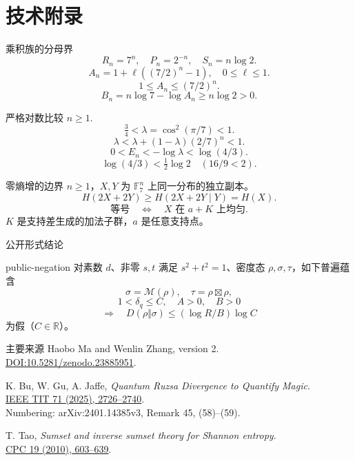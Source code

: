 \documentclass{beamer}
\begin{document}
\section{技术附录}
\begin{frame}{乘积族的分母界}
\[R_n=7^n,\quad P_n=2^{-n},\quad S_n=n\log2.\]
\[A_n=1+\ell((7/2)^n-1),\quad 0\le\ell\le1.\]
\[1\le A_n\le(7/2)^n.\]
\[B_n=n\log7-\log A_n\ge n\log2>0.\]
\end{frame}
\begin{frame}{严格对数比较}
$n\ge1$.
\[\tfrac34\mathrel{<}\lambda=\cos^2(\pi/7)\mathrel{<}1.\]
\[\lambda\mathrel{<}\lambda+(1-\lambda)(2/7)^n\mathrel{<}1.\]
\[0\mathrel{<}E_n\mathrel{<}-\log\lambda\mathrel{<}\log(4/3).\]
\[\log(4/3)\mathrel{<}\tfrac12\log2\quad(16/9\mathrel{<}2).\]
\end{frame}
\begin{frame}{零熵增的边界}
$n\ge1$，$X,Y$ 为 $\mathbb F_7^n$ 上同一分布的独立副本。
\[H(2X+2Y)\ge H(2X+2Y\mid Y)=H(X).\]
\[\text{等号}\quad\Longleftrightarrow\quad X\text{ 在 }a+K\text{ 上均匀}.\]
$K$ 是支持差生成的加法子群，$a$ 是任意支持点。

\end{frame}
\begin{frame}{公开形式结论}
\begin{bookresult}{public-negation}
对素数 $d$、非零 $s,t$ 满足 $s^2+t^2=1$、密度态 $\rho,\sigma,\tau$，如下普遍蕴含
\[\sigma=\mathcal M(\rho),\quad\tau=\rho\boxtimes\rho,\]
\[1\mathrel{<}\delta_q\le C,\quad A>0,\quad B>0\]
\[\Longrightarrow\quad D(\rho\Vert\sigma)\le(\log R/B)\log C\]
为假（$C\in\mathbb R$）。
\end{bookresult}
\end{frame}
\begin{frame}{主要来源}
\small
Haobo Ma and Wenlin Zhang, version 2.\\
\href{https://doi.org/10.5281/zenodo.23885951}{DOI:10.5281/zenodo.23885951}.
\medskip

K. Bu, W. Gu, A. Jaffe, \emph{Quantum Ruzsa Divergence to Quantify Magic}.\\
\href{https://doi.org/10.1109/TIT.2025.3543276}{IEEE TIT 71 (2025), 2726--2740}.\\
Numbering: arXiv:2401.14385v3, Remark 45, (58)--(59).
\medskip

T. Tao, \emph{Sumset and inverse sumset theory for Shannon entropy}.\\
\href{https://doi.org/10.1017/S0963548309990642}{CPC 19 (2010), 603--639}.
\end{frame}
\FormalVerification
\end{document}
